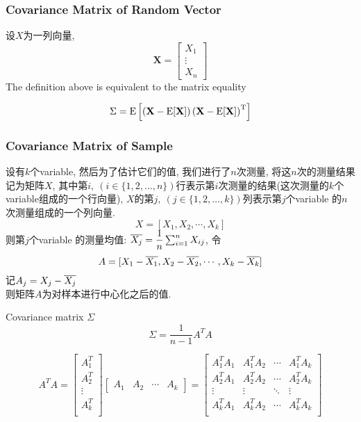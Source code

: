 \documentclass{article}
\begin{document}
\subsubsection{Covariance Matrix of Random Vector}
设$X$为一列向量,
$$ \mathbf{X} = \begin{bmatrix}X_1 \\ \vdots \\ X_n \end{bmatrix} $$
The definition above is equivalent to the matrix equality

$$
\Sigma=\mathrm{E}
\left[
 \left(
 \textbf{X} - \mathrm{E}[\textbf{X}]
 \right)
 \left(
 \textbf{X} - \mathrm{E}[\textbf{X}]
 \right)^{\rm T}
\right]
$$

\subsubsection{Covariance Matrix of Sample}
设有$k$个variable, 然后为了估计它们的值, 我们进行了$n$次测量, 将这$n$次的测量结果记为矩阵$X$, 其中第$i,\ (i \in \{1,2, \ldots, n\})$行表示第$i$次测量的结果(这次测量的$k$个variable组成的一个行向量), $X$的第$j,\ (j \in \{1,2, \ldots, k\})$列表示第$j$个variable 的$n$次测量组成的一个列向量.\\
$$X = [X_1, X_2, \cdots, X_k]$$
则第$j$个variable 的测量均值: $\overline{X_j} = \dfrac{1}{n} \sum_{i= 1}^n X_{ij}$, 令
$$A = [X_1 - \overline{X_1}, X_2 - \overline{X_2}, \cdots, X_k - \overline{X_k}]$$
记$A_j = X_j - \overline{X_j}$\\
则矩阵$A$为对样本进行中心化之后的值.

Covariance matrix $\Sigma$
$$
\Sigma = \dfrac{1}{n - 1} A^T A
$$

$$
A^T A =
\begin{bmatrix}
A_1^T \\
A_2^T \\
\vdots \\
A_k^T \\
\end{bmatrix}
\begin{bmatrix}
A_1 & A_2& \cdots & A_k
\end{bmatrix}
=
\begin{bmatrix}
A_1^T A_1 & A_1^T A_2 & \cdots & A_1^T A_k \\
A_2^T A_1 & A_2^T A_2 & \cdots & A_2^T A_k \\
\vdots & \vdots & \ddots & \vdots \\
A_k^T A_1 & A_k^T A_2 & \cdots & A_k^T A_k \\
\end{bmatrix}
$$
\end{document}
